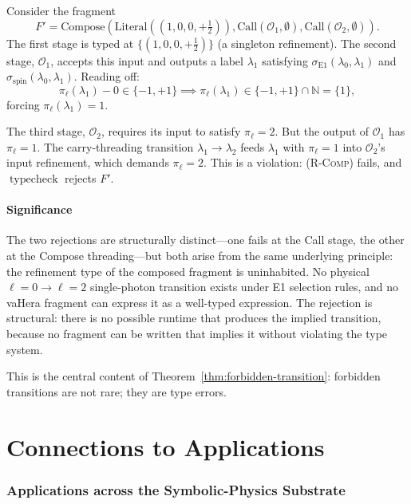 \documentclass[twocolumn,11pt,a4paper]{article}
\DeclareMathOperator{\typecheck}{typecheck}
\newcommand{\Natural}{\mathbb{N}}
\newcommand{\Sel}{\sigma}
\newcommand{\Frag}{F}
\newcommand{\Op}{\mathcal{O}}
\newcommand{\rul}[1]{\textsc{(#1)}}
\newcommand{\vCall}[2]{\mathrm{Call}(#1,#2)}
\newcommand{\vComp}[1]{\mathrm{Compose}(#1)}
\newcommand{\vLit}[1]{\mathrm{Literal}(#1)}
\begin{document}
Consider the fragment
\[
\Frag' = \vComp{\vLit{(1, 0, 0, +\tfrac{1}{2})}, \vCall{\Op_1}{\emptyset}, \vCall{\Op_2}{\emptyset}}.
\]
The first stage is typed at $\{(1, 0, 0, +\tfrac{1}{2})\}$ (a singleton refinement). The second stage, $\Op_1$, accepts this input and outputs a label $\lambda_1$ satisfying $\Sel_{\mathrm{E1}}(\lambda_0, \lambda_1)$ and $\Sel_{\mathrm{spin}}(\lambda_0, \lambda_1)$. Reading off:
\[
\pi_\ell(\lambda_1) - 0 \in \{-1, +1\} \implies \pi_\ell(\lambda_1) \in \{-1, +1\} \cap \Natural = \{1\},
\]
forcing $\pi_\ell(\lambda_1) = 1$.

The third stage, $\Op_2$, requires its input to satisfy $\pi_\ell = 2$. But the output of $\Op_1$ has $\pi_\ell = 1$. The carry-threading transition $\lambda_1 \to \lambda_2$ feeds $\lambda_1$ with $\pi_\ell = 1$ into $\Op_2$'s input refinement, which demands $\pi_\ell = 2$. This is a violation: \rul{R-Comp} fails, and $\typecheck$ rejects $\Frag'$.

\subsection{Significance}

The two rejections are structurally distinct---one fails at the Call stage, the other at the Compose threading---but both arise from the same underlying principle: the refinement type of the composed fragment is uninhabited. No physical $\ell = 0 \to \ell = 2$ single-photon transition exists under E1 selection rules, and no vaHera fragment can express it as a well-typed expression. The rejection is structural: there is no possible runtime that produces the implied transition, because no fragment can be written that implies it without violating the type system.

This is the central content of Theorem~\ref{thm:forbidden-transition}: forbidden transitions are not rare; they are type errors.

\part{Connections to Applications}

\section{Applications across the Symbolic-Physics Substrate}
\label{sec:applications}
\end{document}

